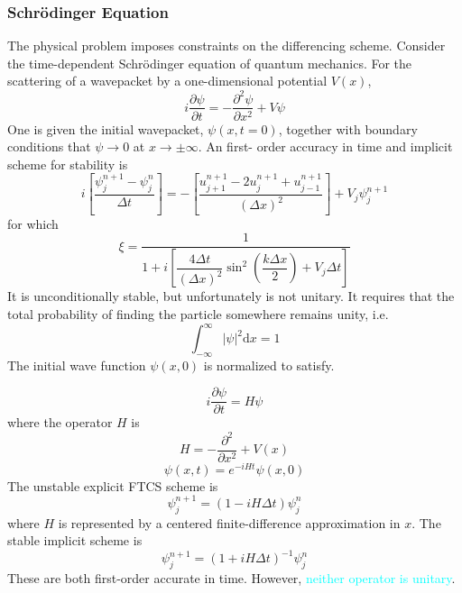 \documentclass[12pt,a4paper]{article}
\newcommand{\dif}{\mathrm{d}}
\begin{document}
\subsubsection{Schr\"odinger Equation}
The physical problem imposes constraints on the differencing scheme. Consider the time-dependent Schr\"odinger equation of quantum mechanics. For the scattering of a wavepacket by a one-dimensional potential $V(x)$, 
\begin{equation}
i \frac{\partial \psi}{\partial t} = -\frac{\partial^2 \psi}{\partial x^2} +V\psi
\end{equation}
One is given the initial wavepacket, $\psi(x, t = 0)$, together with boundary conditions that $\psi \rightarrow 0$ at $x \rightarrow \pm \infty$. An first- order accuracy in time and implicit scheme for stability is
\begin{equation}
i \left[\frac{\psi_j^{n+1} -\psi_j^{n}}{\Delta t} \right] = - \left[\frac{u_{j+1}^{n+1} -2u_j^{n+1} +u_{j-1}^{n+1}}{(\Delta x)^2} \right] +V_j \psi^{n+1}_j
\end{equation}
for which 
\begin{equation}
\xi = \frac{1}{1+i \left[ \dfrac{4\Delta t}{(\Delta x)^2} \sin^2 \left( \dfrac{k \Delta x}{2} \right) +V_j \Delta t \right]}
\end{equation}
It is unconditionally stable, but unfortunately is not unitary. It requires that the total probability of finding the particle somewhere remains unity, i.e.
\begin{equation}
\int_{-\infty}^\infty |\psi|^2 \dif x = 1
\end{equation}
The initial wave function $\psi(x, 0)$ is normalized to satisfy.

\begin{equation}
i \frac{\partial \psi}{\partial t} = H \psi
\end{equation}
where the operator $H$ is
\begin{equation}
H = -\frac{\partial^2}{\partial x^2} +V(x)
\end{equation}
\begin{equation}
\psi(x, t) = e^{-iHt} \psi(x, 0)
\end{equation}
The unstable explicit FTCS scheme is
\begin{equation}
\psi_j^{n+1} = (1-iH \Delta t)\psi_j^{n}
\end{equation}
where $H$ is represented by a centered finite-difference approximation in $x$. The stable implicit scheme is
\begin{equation}
\psi_j^{n+1} = (1+iH \Delta t)^{-1} \psi_j^{n}
\end{equation}
These are both first-order accurate in time. However, \textcolor{cyan}{neither operator is unitary}.
\end{document}
